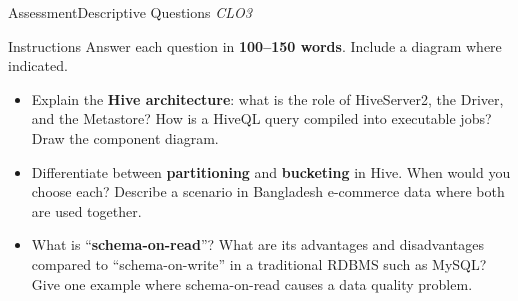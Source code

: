 \documentclass[aspectratio=169,10pt]{beamer}
\begin{document}
\begin{frame}{Assessment\textemdash Descriptive Questions \hfill\small\textit{CLO3}}
  \begin{block}{Instructions}
    Answer each question in \textbf{100--150 words}.  Include a diagram where indicated.
  \end{block}
  \vspace{8pt}
  \begin{itemize}
    \item[\textbf{D1.}] Explain the \textbf{Hive architecture}: what is the role of HiveServer2, the Driver, and the Metastore?  How is a HiveQL query compiled into executable jobs?  Draw the component diagram.
  \end{itemize}
  \vspace{8pt}
  \begin{itemize}
    \item[\textbf{D2.}] Differentiate between \textbf{partitioning} and \textbf{bucketing} in Hive.  When would you choose each?  Describe a scenario in Bangladesh e-commerce data where both are used together.
  \end{itemize}
  \vspace{8pt}
  \begin{itemize}
    \item[\textbf{D3.}] What is ``\textbf{schema-on-read}''?  What are its advantages and disadvantages compared to ``schema-on-write'' in a traditional RDBMS such as MySQL?  Give one example where schema-on-read causes a data quality problem.
  \end{itemize}
\end{frame}
\end{document}
